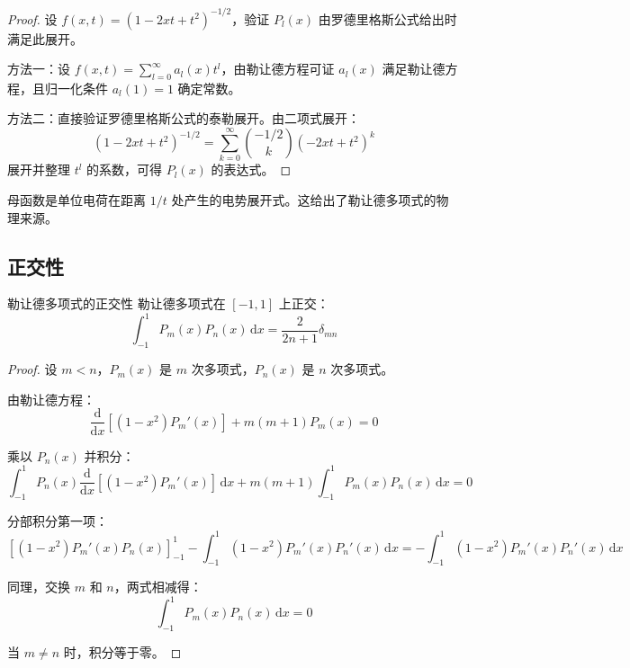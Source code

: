 \begin{proof}
设 $f(x, t) = (1 - 2xt + t^2)^{-1/2}$，验证 $P_l(x)$ 由罗德里格斯公式给出时满足此展开。

方法一：设 $f(x, t) = \sum_{l=0}^{\infty} a_l(x) t^l$，由勒让德方程可证 $a_l(x)$ 满足勒让德方程，且归一化条件 $a_l(1) = 1$ 确定常数。

方法二：直接验证罗德里格斯公式的泰勒展开。由二项式展开：
\begin{equation}
    (1 - 2xt + t^2)^{-1/2} = \sum_{k=0}^{\infty} \binom{-1/2}{k} (-2xt + t^2)^k
\end{equation}
展开并整理 $t^l$ 的系数，可得 $P_l(x)$ 的表达式。
\end{proof}
\begin{wulibj}[母函数的物理意义]
母函数是单位电荷在距离 $1/t$ 处产生的电势展开式。这给出了勒让德多项式的物理来源。
\end{wulibj}

\subsection{正交性}

\begin{dingli}{勒让德多项式的正交性}{}
勒让德多项式在 $[-1, 1]$ 上正交：
\[
    \int_{-1}^{1} P_m(x)P_n(x)\,\mathrm{d}x = \frac{2}{2n+1}\delta_{mn}
\]
\end{dingli}

\begin{proof}
设 $m < n$，$P_m(x)$ 是 $m$ 次多项式，$P_n(x)$ 是 $n$ 次多项式。

由勒让德方程：
\begin{equation}
    \frac{\mathrm{d}}{\mathrm{d}x}\left[(1-x^2)P_m'(x)\right] + m(m+1)P_m(x) = 0
\end{equation}

乘以 $P_n(x)$ 并积分：
\begin{equation}
    \int_{-1}^{1} P_n(x)\frac{\mathrm{d}}{\mathrm{d}x}\left[(1-x^2)P_m'(x)\right]\,\mathrm{d}x + m(m+1)\int_{-1}^{1} P_m(x)P_n(x)\,\mathrm{d}x = 0
\end{equation}

分部积分第一项：
\begin{equation}
    \left[(1-x^2)P_m'(x)P_n(x)\right]_{-1}^{1} - \int_{-1}^{1} (1-x^2)P_m'(x)P_n'(x)\,\mathrm{d}x = -\int_{-1}^{1} (1-x^2)P_m'(x)P_n'(x)\,\mathrm{d}x
\end{equation}

同理，交换 $m$ 和 $n$，两式相减得：
\begin{equation}
    [n(n+1) - m(m+1)]\int_{-1}^{1} P_m(x)P_n(x)\,\mathrm{d}x = 0
\end{equation}

当 $m \neq n$ 时，积分等于零。
\end{proof}


